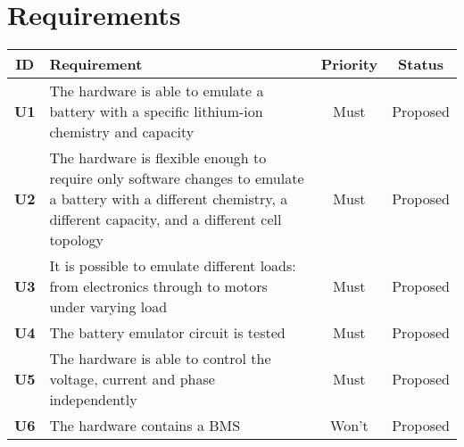 \section{Requirements}
\begin{longtable}{|c|p{10cm}|c|c|}
    \hline
    \textbf{ID} & \textbf{Requirement} & \textbf{Priority} & \textbf{Status}\\ \hline 
    \textbf{U1} & The hardware is able to emulate a battery with a specific lithium-ion chemistry and capacity & Must & Proposed\\ \hline
    \textbf{U2} & The hardware is flexible enough to require only software changes to emulate a battery with a different chemistry, a different capacity, and a different cell topology & Must & Proposed\\ \hline
    \textbf{U3} & It is possible to emulate different loads: from electronics through to motors under varying load & Must & Proposed\\ \hline
    \textbf{U4} & The battery emulator circuit is tested & Must & Proposed\\ \hline
    \textbf{U5} & The hardware is able to control the voltage, current and phase independently & Must & Proposed\\ \hline
    \textbf{U6} & The hardware contains a BMS & Won't & Proposed\\ \hline
\end{longtable}